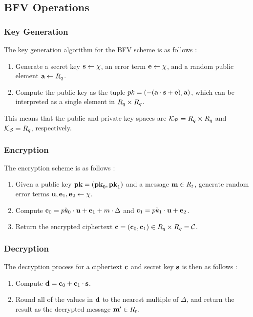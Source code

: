\documentclass{theme}
\begin{document}
\subsection{BFV Operations}

\subsubsection{Key Generation}

The key generation algorithm for the BFV scheme is as follows \cite{fhe}:
\begin{enumerate}
    \item Generate a secret key $\textbf{s} \leftarrow \chi$, an error term $\textbf{e} \leftarrow \chi$, and a random public element $\textbf{a} \leftarrow R_q$.
    \item Compute the public key as the tuple $pk = (-(\textbf{a} \cdot \textbf{s} + \textbf{e}), \textbf{a})$, which can be interpreted as a single element in $R_q \times R_q$.
\end{enumerate}

This means that the public and private key spaces are $\mathcal{K_P} = R_q \times R_q$ and $\mathcal{K_S} = R_q$, respectively.

\subsubsection{Encryption}

The encryption scheme is as follows \cite{fhe}:
\begin{enumerate}
    \item Given a public key $\textbf{pk} = (\textbf{pk}_0, \textbf{pk}_1)$ and a message $\textbf{m} \in R_t$, generate random error terms $\textbf{u}, \textbf{e}_1, \textbf{e}_2 \leftarrow \chi$.
    \item Compute $\textbf{c}_0 = pk_0 \cdot \textbf{u} + \textbf{e}_1 + m \cdot \Delta$ and $\textbf{c}_1 = pk_1 \cdot \textbf{u} + \textbf{e}_2$.
    \item Return the encrypted ciphertext $\textbf{c} = (\textbf{c}_0, \textbf{c}_1) \in R_q \times R_q = \mathcal{C}$.
\end{enumerate}

\subsubsection{Decryption}

The decryption process for a ciphertext $\textbf{c}$ and secret key $\textbf{s}$ is then as follows \cite{fhe}:

\begin{enumerate}
    \item Compute $\textbf{d}= \textbf{c}_0 + \textbf{c}_1 \cdot \textbf{s}$.
    \item Round all of the values in $\textbf{d}$ to the nearest multiple of $\Delta$, and return the result as the decrypted message $\textbf{m}' \in R_t$.
\end{enumerate}
\end{document}

